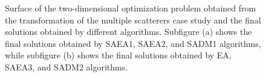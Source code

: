 			\begin{figure}
				\centering
				 \hspace{.05\textwidth}
				\caption[Surface of the two-dimensional optimization problem obtained from the transformation of the multiple scatterers case study and the final solutions obtained by different algorithms.]{Surface of the two-dimensional optimization problem obtained from the transformation of the multiple scatterers case study and the final solutions obtained by different algorithms. Subfigure (a) shows the final solutions obtained by SAEA1, SAEA2, and SADM1 algorithms, while subfigure (b) shows the final solutions obtained by EA, SAEA3, and SADM2 algorithms.}
				\label{fig:results:casestudy:multiple:surface}
			\end{figure}
		
		

